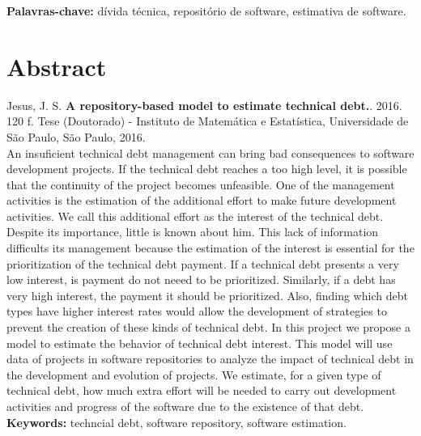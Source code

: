 \documentclass[11pt,twoside,a4paper]{book}
\begin{document}
\noindent \textbf{Palavras-chave:} dívida técnica, repositório de software, estimativa de software.

\chapter*{Abstract}
\noindent Jesus, J. S. \textbf{A repository-based model to estimate technical debt.}. 
2016. 120 f.
Tese (Doutorado) - Instituto de Matemática e Estatística,
Universidade de São Paulo, São Paulo, 2016.
\\


An insuficient technical debt management can bring bad consequences to software development projects. If the technical debt reaches a too high level, it is possible that the continuity of the project becomes unfeasible.
One of the management activities is the estimation of the additional effort  to make future development activities. We call this additional effort as the  interest of the technical debt. Despite its importance, little is known about him. This lack of information difficults its management because the estimation of the interest is essential for the prioritization of the technical debt payment. If a technical debt presents a very low interest, is payment do not neeed to be prioritized. Similarly, if a debt has very high interest, the payment it should be prioritized. Also, finding which debt types have higher interest rates would allow the development of strategies to prevent the creation of these kinds of technical debt. In this project we propose a model to estimate the behavior of technical debt interest. This model will use data of  projects in software repositories to analyze the impact of technical debt in the development and evolution of projects. We estimate, for a given type of technical debt, how much extra effort will be needed to carry out development activities and progress of the software due to the existence of that debt.
\\

\noindent \textbf{Keywords:} techncial debt, software repository, software estimation.

\tableofcontents    %

         
\end{document}
